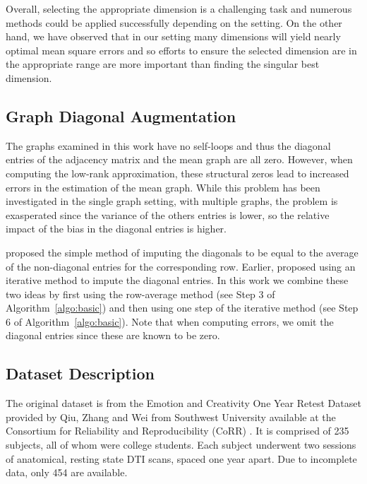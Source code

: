 \documentclass[a4paper]{article}
\begin{document}
Overall, selecting the appropriate dimension is a challenging task and numerous methods could be applied successfully depending on the setting.
On the other hand, we have observed that in our setting many dimensions will yield nearly optimal mean square errors and so efforts to ensure the selected dimension are in the appropriate range are more important than finding the singular best dimension.



\subsection{Graph Diagonal Augmentation}
\label{section:diag_aug}
The graphs examined in this work have no self-loops and thus the diagonal entries of the adjacency matrix and the mean graph are all zero.
However, when computing the low-rank approximation, these structural zeros lead to increased errors in the estimation of the mean graph. 
While this problem has been investigated in the single graph setting, with multiple graphs, the problem is exasperated since the variance of the others entries is lower, so the relative impact of the bias in the diagonal entries is higher.

\citet{marchette2011vertex}  proposed the simple method of imputing the diagonals to be equal to the average of the non-diagonal entries for the corresponding row.
Earlier, \citet{scheinerman2010modeling} proposed using an iterative method to impute the diagonal entries.
In this work we combine these two ideas by first using the row-average method  (see Step 3 of Algorithm~\ref{algo:basic}) and then using one step of the iterative method (see Step 6 of Algorithm~\ref{algo:basic}).
Note that when computing errors, we omit the diagonal entries since these are known to be zero.



\subsection{Dataset Description}
\label{section:data}
The original dataset is from the Emotion and Creativity One Year Retest Dataset provided by Qiu, Zhang and Wei from Southwest University available at the Consortium for Reliability and Reproducibility (CoRR) \cite{zuo2014open, gorgolewski2015high}. It is comprised of 235 subjects, all of whom were college students. Each subject underwent two sessions of anatomical, resting state DTI scans, spaced one year apart. Due to incomplete data, only 454 are available.
\end{document}
